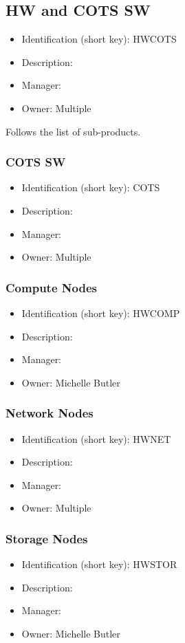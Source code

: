 \subsection{HW and COTS SW}\label{sect:HWCOTS}
\begin{itemize}
\item Identification (short key): HWCOTS
\item Description: 
\item Manager: 
\item Owner: Multiple
\end{itemize}

Follows the list of sub-products.\subsubsection{COTS SW}\label{sect:COTS}
\begin{itemize}
\item Identification (short key): COTS
\item Description: 
\item Manager: 
\item Owner: Multiple
\end{itemize}

\subsubsection{Compute Nodes}\label{sect:HWCOMP}
\begin{itemize}
\item Identification (short key): HWCOMP
\item Description: 
\item Manager: 
\item Owner: Michelle Butler
\end{itemize}

\subsubsection{Network Nodes}\label{sect:HWNET}
\begin{itemize}
\item Identification (short key): HWNET
\item Description: 
\item Manager: 
\item Owner: Multiple
\end{itemize}

\subsubsection{Storage Nodes}\label{sect:HWSTOR}
\begin{itemize}
\item Identification (short key): HWSTOR
\item Description: 
\item Manager: 
\item Owner: Michelle Butler
\end{itemize}

